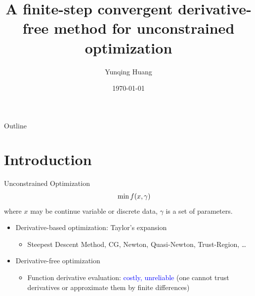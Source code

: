 \documentclass{beamer}
\title[Stick Hill-Climbing Optimization]
{A finite-step convergent derivative-free method for unconstrained
optimization}
\author[Y. Huang, XTU]{Yunqing Huang}
\institute[]{Xiangtan University
\\
\vspace{0.3cm}
joint work with Kai Jiang}
\date{\today }
\begin{document}
\begin{frame}
  \titlepage
\end{frame}

\begin{frame}{Outline}
  \tableofcontents[hideallsubsections]
\end{frame}


\section{Introduction}



\begin{frame}{Unconstrained Optimization}
\begin{align*}
	 \hspace{0.6cm} \min f(x,\gamma)
\end{align*}
where $x$ may be continue variable or discrete data, $\gamma$ is
a set of parameters.

\begin{itemize}
\item Derivative-based optimization: Taylor's expansion
	\begin{itemize}[]
		\item Steepest Descent Method, CG, Newton,
			Quasi-Newton, Trust-Region, \ldots
	\end{itemize}
\item Derivative-free optimization \\
	\begin{itemize}[]
		\item Function derivative evaluation: \large{\textcolor{blue}{costly, unreliable}
			}
			(one cannot trust derivatives or approximate them by finite differences)
	\end{itemize}
\end{itemize}

\end{frame}
\end{document}
